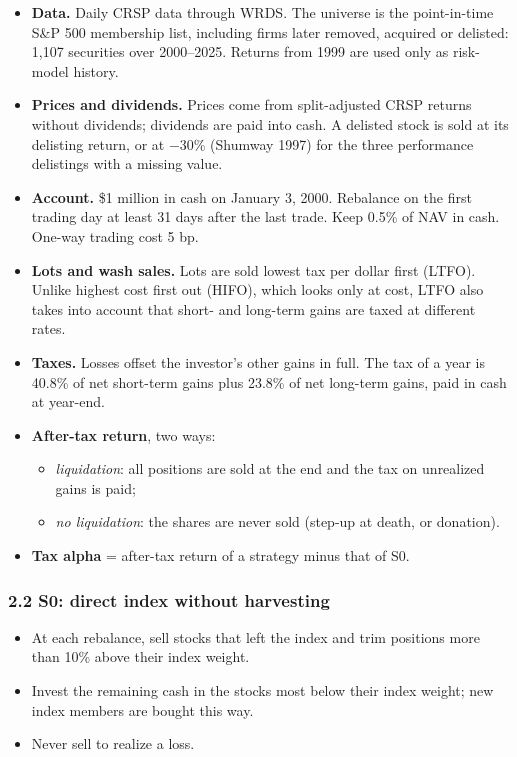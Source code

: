 \documentclass[
  11pt,
]{article}
\providecommand{\tightlist}{%
  \setlength{\itemsep}{0pt}\setlength{\parskip}{0pt}}
\begin{document}
\begin{itemize}
\tightlist
\item
  \textbf{Data.} Daily CRSP data through WRDS. The universe is the point-in-time S\&P 500 membership list, including firms later removed, acquired or delisted: 1,107 securities over 2000--2025. Returns from 1999 are used only as risk-model history.
\item
  \textbf{Prices and dividends.} Prices come from split-adjusted CRSP returns without dividends; dividends are paid into cash. A delisted stock is sold at its delisting return, or at −30\% (Shumway 1997) for the three performance delistings with a
  missing value.
\item
  \textbf{Account.} \$1 million in cash on January 3, 2000. Rebalance on the first trading day at least 31 days after the last trade. Keep 0.5\% of NAV in cash. One-way trading cost 5 bp.
\item
  \textbf{Lots and wash sales.} Lots are sold lowest tax per dollar first (LTFO). Unlike highest cost first out (HIFO), which looks only at cost, LTFO also takes into account that short- and long-term gains are taxed at different rates.
\item
  \textbf{Taxes.} Losses offset the investor's other gains in full. The tax of a year is 40.8\% of net short-term gains plus 23.8\% of net long-term gains, paid in cash at year-end.
\item
  \textbf{After-tax return}, two ways:

  \begin{itemize}
  \tightlist
  \item
    \emph{liquidation}: all positions are sold at the end and the tax on unrealized gains is paid;
  \item
    \emph{no liquidation}: the shares are never sold (step-up at death, or donation).
  \end{itemize}
\item
  \textbf{Tax alpha} = after-tax return of a strategy minus that of S0.
\end{itemize}

\hypertarget{s0-direct-index-without-harvesting}{%
\subsubsection{2.2 S0: direct index without harvesting}\label{s0-direct-index-without-harvesting}}

\begin{itemize}
\tightlist
\item
  At each rebalance, sell stocks that left the index and trim positions more than 10\% above their index weight.
\item
  Invest the remaining cash in the stocks most below their index weight; new index members are bought this way.
\item
  Never sell to realize a loss.
\end{itemize}
\end{document}
